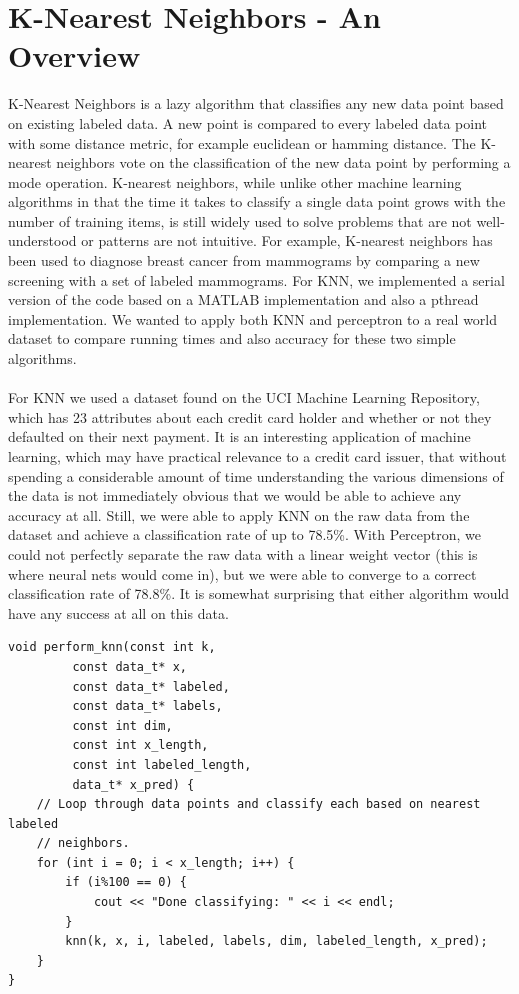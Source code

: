 \documentclass{article}
\begin{document}
\section{K-Nearest Neighbors - An Overview}
K-Nearest Neighbors is a lazy algorithm that classifies any new data point based on existing labeled data. A new point is compared to every labeled data point with some distance metric, for example euclidean or hamming distance. The K-nearest neighbors vote on the classification of the new data point by performing a mode operation. K-nearest neighbors, while unlike other machine learning algorithms in that the time it takes to classify a single data point grows with the number of training items, is still widely used to solve problems that are not well-understood or patterns are not intuitive. For example, K-nearest neighbors has been used to diagnose breast cancer from mammograms by comparing a new screening with a set of labeled mammograms. For KNN, we implemented a serial version of the code based on a MATLAB implementation and also a pthread implementation. We wanted to apply both KNN and perceptron to a real world dataset to compare running times and also accuracy for these two simple algorithms. 
\\ \\
For KNN we used a dataset found on the UCI Machine Learning Repository, 
which has 23 attributes about each credit card holder and whether or not they defaulted on their next payment. It is an interesting application of machine learning, which may have practical relevance to a credit card issuer, that without spending a considerable amount of time understanding the various dimensions of the data is not immediately obvious that we would be able to achieve any accuracy at all. Still, we were able to apply KNN on the raw data from the dataset and achieve a classification rate of up to 78.5\%. With Perceptron, we could not perfectly separate the raw data with a linear weight vector (this is where neural nets would come in), but we were able to converge to a correct classification rate of 78.8\%. It is somewhat surprising that either algorithm would have any success at all on this data.
\begin{verbatim}
void perform_knn(const int k,
         const data_t* x,
         const data_t* labeled,
         const data_t* labels,
         const int dim,
         const int x_length,
         const int labeled_length,
         data_t* x_pred) {
    // Loop through data points and classify each based on nearest labeled
    // neighbors.
    for (int i = 0; i < x_length; i++) {
        if (i%100 == 0) {
            cout << "Done classifying: " << i << endl;
        }
        knn(k, x, i, labeled, labels, dim, labeled_length, x_pred);
    }
}
\end{verbatim}
\end{document}
